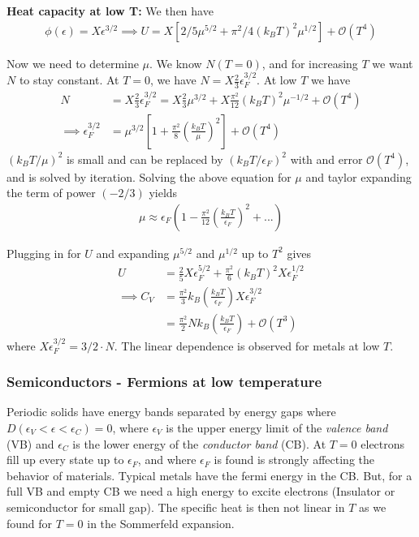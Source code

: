 \documentclass[a4paper, english, 12pt]{article}
\newcommand{\eps}{\epsilon}
\newcommand{\closed}[1]{\left( #1 \right)}
\newcommand{\bracket}[1]{\left[ #1 \right]}
\begin{document}
\begin{multicols*}{2}
\textbf{Heat capacity at low T:} We then have 
\begin{align*}
    \phi(\eps)=X\eps^{3/2}\implies U=X[2/5 \mu^{5/2} + \pi^2/4 (k_B T)^2 \mu^{1/2}] + \mathcal{O}(T^4)
\end{align*}

Now we need to determine $\mu$. We know $N(T=0)$, and for increasing $T$ we want $N$ to stay constant. At $T=0$, we have $N=X\frac{2}{3}\eps_F^{3/2}$. At low $T$ we have 
\begin{align*}
    N &= X \frac{2}{3}\eps_F^{3/2} = X \frac{2}{3}\mu^{3/2} + X\frac{\pi^2}{12} (k_B T)^{2} \mu^{-1/2} + \mathcal{O}(T^4) \\ 
    \implies \eps_F^{3/2} &= \mu^{3/2}\bracket{1+\frac{\pi^2}{8}\closed{\frac{k_B T}{\mu}}^2 } + \mathcal{O}(T^4)
\end{align*}
$(k_B T/\mu)^2$ is small and can be replaced by $(k_B T/\eps_F)^2$ with and error $\mathcal{O}(T^4)$, and is solved by iteration. Solving the above equation for $\mu$ and taylor expanding the term of power $(-2/3)$ yields 
\begin{align*}
    \mu \approx \eps_F \closed{1 - \frac{\pi^2}{12} \closed{\frac{k_B T}{\eps_F}}^2+...}
\end{align*}

Plugging in for $U$ and expanding $\mu^{5/2}$ and $\mu^{1/2}$ up to $T^2$ gives 
\begin{align*}
    U &= \frac{2}{5}X\eps_F^{5/2} + \frac{\pi^2}{6}(k_B T)^2 X\eps_F^{1/2} \\ 
    \implies C_V &= \frac{\pi^2}{3}k_B \closed{\frac{k_B T}{\eps_F}} X \eps_F^{3/2} \\ 
    &= \frac{\pi^2}{2} Nk_B \closed{\frac{k_B T}{\eps_F}} + \mathcal{O}(T^3)
\end{align*}
where $X\eps_F^{3/2}=3/2\cdot N $. The linear dependence is observed for metals at low $T$. 


\subsubsection*{\scriptsize Semiconductors - Fermions at low temperature}

Periodic solids have energy bands separated by energy gaps where $D(\eps_V<\eps<\eps_C)=0$, where $\eps_V$ is the upper energy limit of the \textit{valence band} (VB) and $\eps_C$ is the lower energy of the \textit{conductor band} (CB). At $T=0$ electrons fill up every state up to $\eps_F$, and where $\eps_F$ is found is strongly affecting the behavior of materials. Typical metals have the fermi energy in the CB. But, for a full VB and empty CB we need a high energy to excite electrons (Insulator or semiconductor for small gap). The specific heat is then not linear in $T$ as we found for $T=0$ in the Sommerfeld expansion. 



\end{multicols*}
\end{document}
